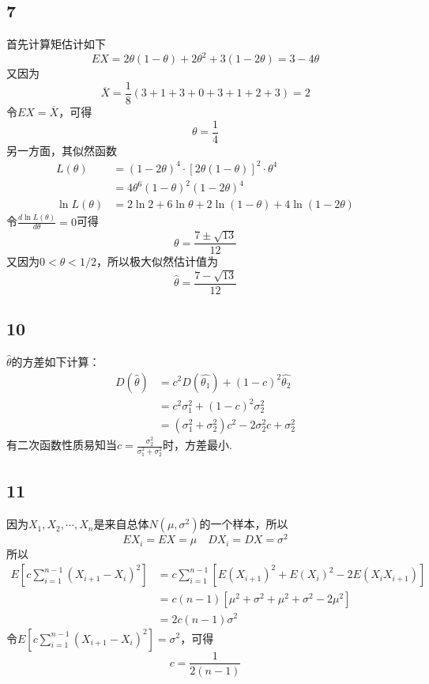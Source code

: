 \documentclass[twocolumn]{article}
\begin{document}
\begin{CJK}{UTF8}{gbsn}
			\subsection*{7}
				首先计算矩估计如下\[EX=2\theta(1-\theta)+2\theta^2+3(1-2\theta)=3-4\theta\]又因为\[\overline{X}=\frac{1}{8}(3+1+3+0+3+1+2+3)=2\]令$EX=\overline{X}$，可得\[\theta=\frac{1}{4}\]另一方面，其似然函数\begin{align*}
					L(\theta) & =  (1-2\theta)^4\cdot[2\theta(1-\theta)]^2\cdot\theta^4\\
					& = 4\theta^6(1-\theta)^2(1-2\theta)^4\\
					\ln L(\theta) & = 2\ln2+6\ln\theta+2\ln(1-\theta)+4\ln(1-2\theta)
				\end{align*}
				令$\frac{d\ln L(\theta)}{d\theta} = 0$可得\[\theta=\frac{7\pm\sqrt{13}}{12}\]又因为$0<\theta<1/2$，所以极大似然估计值为\[\hat{\theta}=\frac{7-\sqrt{13}}{12}\]
			\subsection*{10}
				$\hat{\theta}$的方差如下计算：\begin{align*}
					D(\hat{\theta}) & = c^2D(\hat{\theta_1})+(1-c)^2\hat{\theta_2}\\
					& = c^2\sigma_1^2+(1-c)^2\sigma_2^2\\
					& = (\sigma_1^2+\sigma_2^2)c^2-2\sigma_2^2c+\sigma_2^2
				\end{align*}
				有二次函数性质易知当$c=\frac{\sigma_2^2}{\sigma_1^2+\sigma_2^2}$时，方差最小.
			\subsection*{11}
				因为$X_1,X_2,\cdots,X_n$是来自总体$N(\mu,\sigma^2)$的一个样本，所以\[EX_i=EX=\mu\quad DX_i=DX=\sigma^2\]所以\begin{align*}
					E[c\sum_{i=1}^{n-1}(X_{i+1}-X_i)^2] & = c\sum_{i=1}^{n-1}[E(X_{i+1})^2+E(X_{i})^2-2E(X_iX_{i+1})]\\
					& = c(n-1)[\mu^2+\sigma^2+\mu^2+\sigma^2-2\mu^2]\\
					& = 2c(n-1)\sigma^2
				\end{align*}
				令$E[c\sum_{i=1}^{n-1}(X_{i+1}-X_i)^2]=\sigma^2$，可得\[c=\frac{1}{2(n-1)}\]

\end{CJK}
\end{document}
